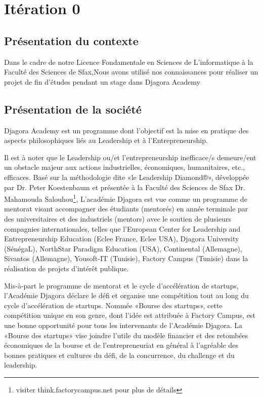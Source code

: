 \section{Itération 0}
\subsection{Présentation du contexte}
Dans le cadre de notre Licence Fondamentale en Sciences de L'informatique à 
la Faculté des Sciences de Sfax,Nous avons utilisé nos connaissances pour 
réaliser un projet de fin d'études pendant un stage dans Djagora Academy 


\subsection{Présentation de la société}
Djagora Academy est un programme dont l'objectif est la mise en pratique des
aspects philosophiques liés au Leadership et à l'Entrepreneurship.

Il est à noter que le Leadership ou/et l'entrepreneurship inefficace/s
demeure/ent un obstacle majeur aux actions industrielles, économiques,
humanitaires, etc., efficaces.
Basé sur la méthodologie dite «le Leadership Diamond®», développée par Dr. Peter
Koestenbaum et présentée à la Faculté des Sciences de Sfax Dr. Mahamouda
Salouhou\footnote{visiter think.factorycampus.net pour plus de détails},
L'académie Djagora est vue comme un programme de mentorat visant accompagner des
étudiants (mentorés) en année terminale par des universitaires et des
industriels (mentors) avec le soutien de plusieurs compagnies internationales,
telles que l'European Center for Leadership and Entrepreneurship Education
(Eclee France, Eclee USA), Djagora University (SénégaL), NorthStar Paradigm
Education (USA), Continental (Allemagne), Sivantos (Allemagne), Yousoft-IT
(Tunisie), Factory Campus (Tunisie) dans la réalisation de projets d’intérêt
publique.


Mis-à-part le programme de mentorat et le cycle d’accélération de startups,
l'Académie Djagora déclare le défi et organise une compétition tout au long
du cycle d’accélération de startups. Nommée «Bourse des startups», cette
compétition unique en son genre, dont l'idée est attribuée à Factory Campus,
est une bonne opportunité pour tous les intervenants de l'Académie Djagora.
La «Bourse des startups» vise joindre l'utile du modèle financier et des retombées
économiques de la bourse et de l'entrepreneuriat en général à l'agréable des
bonnes pratiques et cultures du défi, de la concurrence, du challenge et du
leadership.

